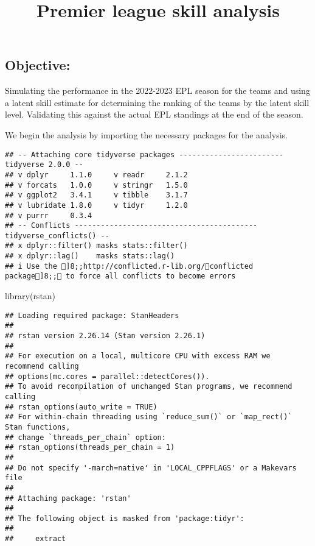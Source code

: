\documentclass[
]{article}
\title{Premier league skill analysis}
\author{}
\date{\vspace{-2.5em}}
\newenvironment{Shaded}{\begin{snugshade}}{\end{snugshade}}
\newcommand{\AttributeTok}[1]{\textcolor[rgb]{0.77,0.63,0.00}{#1}}
\newcommand{\ConstantTok}[1]{\textcolor[rgb]{0.00,0.00,0.00}{#1}}
\newcommand{\FunctionTok}[1]{\textcolor[rgb]{0.00,0.00,0.00}{#1}}
\newcommand{\NormalTok}[1]{#1}
\newcommand{\SpecialCharTok}[1]{\textcolor[rgb]{0.00,0.00,0.00}{#1}}
\begin{document}
\maketitle

\hypertarget{objective}{%
\subsection{Objective:}\label{objective}}

Simulating the performance in the 2022-2023 EPL season for the teams and
using a latent skill estimate for determining the ranking of the teams
by the latent skill level. Validating this against the actual EPL
standings at the end of the season.

We begin the analysis by importing the necessary packages for the
analysis.

\begin{Shaded}
\end{Shaded}

\begin{verbatim}
## -- Attaching core tidyverse packages ------------------------ tidyverse 2.0.0 --
## v dplyr     1.1.0     v readr     2.1.2
## v forcats   1.0.0     v stringr   1.5.0
## v ggplot2   3.4.1     v tibble    3.1.7
## v lubridate 1.8.0     v tidyr     1.2.0
## v purrr     0.3.4     
## -- Conflicts ------------------------------------------ tidyverse_conflicts() --
## x dplyr::filter() masks stats::filter()
## x dplyr::lag()    masks stats::lag()
## i Use the ]8;;http://conflicted.r-lib.org/conflicted package]8;; to force all conflicts to become errors
\end{verbatim}

\begin{Shaded}
\begin{Highlighting}[]
\FunctionTok{library}\NormalTok{(rstan)}
\end{Highlighting}
\end{Shaded}

\begin{verbatim}
## Loading required package: StanHeaders
## 
## rstan version 2.26.14 (Stan version 2.26.1)
## 
## For execution on a local, multicore CPU with excess RAM we recommend calling
## options(mc.cores = parallel::detectCores()).
## To avoid recompilation of unchanged Stan programs, we recommend calling
## rstan_options(auto_write = TRUE)
## For within-chain threading using `reduce_sum()` or `map_rect()` Stan functions,
## change `threads_per_chain` option:
## rstan_options(threads_per_chain = 1)
## 
## Do not specify '-march=native' in 'LOCAL_CPPFLAGS' or a Makevars file
## 
## Attaching package: 'rstan'
## 
## The following object is masked from 'package:tidyr':
## 
##     extract
\end{verbatim}
\end{document}
